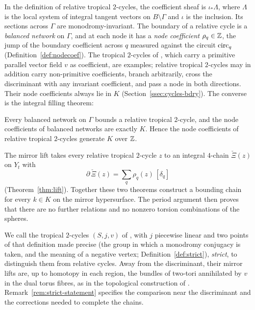 In the definition of relative tropical $2$-cycles, the coefficient sheaf is $\iota_*\Lambda$, where
$\Lambda$ is the local system of integral tangent vectors on $B\setminus\Gamma$ and $\iota$ is the inclusion.
Its sections across $\Gamma$ are monodromy-invariant. The boundary of a relative cycle is a
\emph{balanced network} on $\Gamma$, and at each node it has a \emph{node coefficient} $\rho_q\in\mathbb Z$, the jump of the
boundary coefficient across $q$ measured against the circuit $\mathrm{circ}_q$ (Definition~\ref{def:nodecoef}). The tropical
$2$-cycles of \cite{CBM}, which carry a primitive parallel vector field $v$ as coefficient, are examples; relative
tropical $2$-cycles may in addition carry non-primitive coefficients, branch arbitrarily, cross the discriminant with any
invariant coefficient, and pass a node in both directions. Their node
coefficients always lie in $K$ (Section~\ref{ssec:cycles-bdry}). The converse is the integral filling theorem:

\begin{theorem*}
Every balanced network on $\Gamma$ bounds a relative tropical $2$-cycle, and the node coefficients of balanced networks
are exactly $K$. Hence the node coefficients of relative tropical $2$-cycles generate $K$ over $\mathbb Z$.
\end{theorem*}

The mirror lift takes every relative tropical $2$-cycle $z$ to an integral $4$-chain $\check\Xi(z)$ on $Y_t$ with
\[
\partial\,\check\Xi(z)=\sum_q\rho_q(z)\,[\delta_q]
\]
(Theorem~\ref{thm:lift}). Together these two theorems construct a bounding chain for every $k\in K$ on the mirror
hypersurface. The period argument then proves that there are no further relations and no nonzero torsion
combinations of the spheres.

We call the tropical $2$-cycles $(S,j,v)$ of \cite[Def.~7.2]{CBM}, with $j$ piecewise linear and two points of that
definition made precise (the group in which a monodromy conjugacy is taken, and the meaning of a negative vertex;
Definition~\ref{def:strict}), \emph{strict}, to distinguish them from relative cycles. Away from the discriminant, their mirror lifts are, up to homotopy in each region, the bundles of two-tori
annihilated by $v$ in the dual torus fibres, as in the topological construction of \cite{CBM}.
Remark~\ref{rem:strict-statement} specifies the comparison near the discriminant and the corrections needed to
complete the chains.

